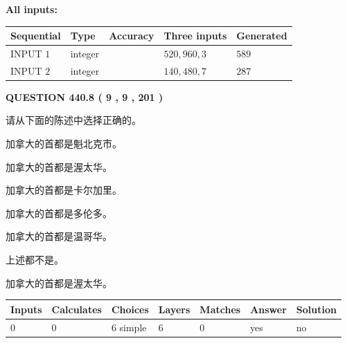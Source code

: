 \documentclass{ctexart}
\begin{document}
   
   
   
\noindent\vspace{0.1in}\hspace{-0.08in} {\textbf{\Large{All inputs: }}}
   
   
  
  
\noindent\begin{tabular}{|l|l|l|l|l|}
\hline
 Sequential & Type & Accuracy & Three inputs & Generated \\ 
\hline
 
 
  INPUT $  1 $ & integer &  & $
 520
 , 
 960
 , 
 3
 $ & $ 589 $ 
 \\  \hline  
 
 
  INPUT $  2 $ & integer &  & $
 140
 , 
 480
 , 
 7
 $ & $ 287 $ 
 \\  \hline  
 \end{tabular}
   
   
  
\vspace{0.2in}
  
{\textbf{\Large{QUESTION
440.8 
 ( 9 , 9 , 201 )
}}}
  
  
请从下面的陈述中选择正确的。
 
 
加拿大的首都是魁北克市。
 
 
加拿大的首都是渥太华。
 
 
加拿大的首都是卡尔加里。
 
 
加拿大的首都是多伦多。
 
 
加拿大的首都是温哥华。
 
 
 上述都不是。
 
 
\noindent{}
 
 
加拿大的首都是渥太华。
 
 
\noindent{}
 
 
   
   
   
   
\noindent\begin{tabular}{|l|l|l|l|l|l|l|}
 \hline
Inputs & Calculates & Choices & Layers & Matches & Answer & Solution \\ \hline
 0  & 
 0  & 
 6
  simple  
  & 
 6  & 
 0  & 
  yes & 
  no 
  \\ \hline
 \end{tabular}
   
\end{document}
